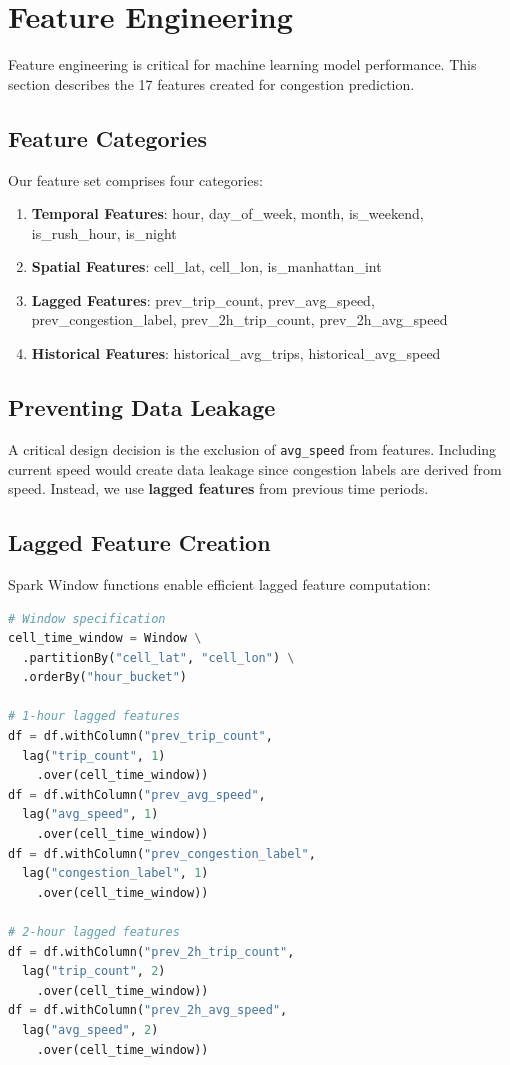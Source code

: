 \documentclass[conference]{IEEEtran}
\begin{document}
\section{Feature Engineering}

Feature engineering is critical for machine learning model performance. This section describes the 17 features created for congestion prediction.

\subsection{Feature Categories}

Our feature set comprises four categories:

\begin{enumerate}
    \item \textbf{Temporal Features}: hour, day\_of\_week, month, is\_weekend, is\_rush\_hour, is\_night
    \item \textbf{Spatial Features}: cell\_lat, cell\_lon, is\_manhattan\_int
    \item \textbf{Lagged Features}: prev\_trip\_count, prev\_avg\_speed, prev\_congestion\_label, prev\_2h\_trip\_count, prev\_2h\_avg\_speed
    \item \textbf{Historical Features}: historical\_avg\_trips, historical\_avg\_speed
\end{enumerate}

\subsection{Preventing Data Leakage}

A critical design decision is the exclusion of \texttt{avg\_speed} from features. Including current speed would create data leakage since congestion labels are derived from speed. Instead, we use \textbf{lagged features} from previous time periods.

\subsection{Lagged Feature Creation}

Spark Window functions enable efficient lagged feature computation:

\begin{lstlisting}[caption={Lagged Features with Window Functions},language=Python]
# Window specification
cell_time_window = Window \
  .partitionBy("cell_lat", "cell_lon") \
  .orderBy("hour_bucket")

# 1-hour lagged features
df = df.withColumn("prev_trip_count", 
  lag("trip_count", 1)
    .over(cell_time_window))
df = df.withColumn("prev_avg_speed", 
  lag("avg_speed", 1)
    .over(cell_time_window))
df = df.withColumn("prev_congestion_label", 
  lag("congestion_label", 1)
    .over(cell_time_window))

# 2-hour lagged features
df = df.withColumn("prev_2h_trip_count", 
  lag("trip_count", 2)
    .over(cell_time_window))
df = df.withColumn("prev_2h_avg_speed", 
  lag("avg_speed", 2)
    .over(cell_time_window))
\end{lstlisting}
\end{document}
